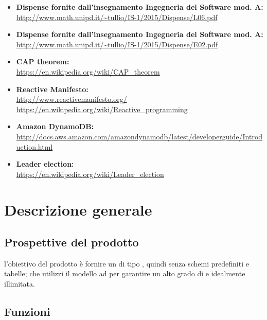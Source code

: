 \documentclass{scalatekids-article}
\begin{document}
\begin{itemize}
\item\textbf{Dispense fornite dall'insegnamento Ingegneria del Software mod. A:}\\
  \url{http://www.math.unipd.it/~tullio/IS-1/2015/Dispense/L06.pdf}
\item\textbf{Dispense fornite dall'insegnamento Ingegneria del Software mod. A:}\\
  \url{http://www.math.unipd.it/~tullio/IS-1/2015/Dispense/E02.pdf}
\item\textbf{CAP theorem:}\\
  \url{https://en.wikipedia.org/wiki/CAP_theorem}
\item\textbf{Reactive Manifesto:}\\
  \url{http://www.reactivemanifesto.org/}\\
  \url{https://en.wikipedia.org/wiki/Reactive_programming}
\item\textbf{Amazon DynamoDB:}\\
  \url{http://docs.aws.amazon.com/amazondynamodb/latest/developerguide/Introduction.html}
\item\textbf{Leader election:}\\
  \url{https://en.wikipedia.org/wiki/Leader_election}
\end{itemize}

\section{Descrizione generale}

\subsection{Prospettive del prodotto}

l'obiettivo del prodotto è fornire un   di tipo
, quindi senza schemi predefiniti e tabelle; che utilizzi il
modello ad  per garantire un alto grado di  e
 idealmente illimitata.

\subsection{Funzioni}
\end{document}
